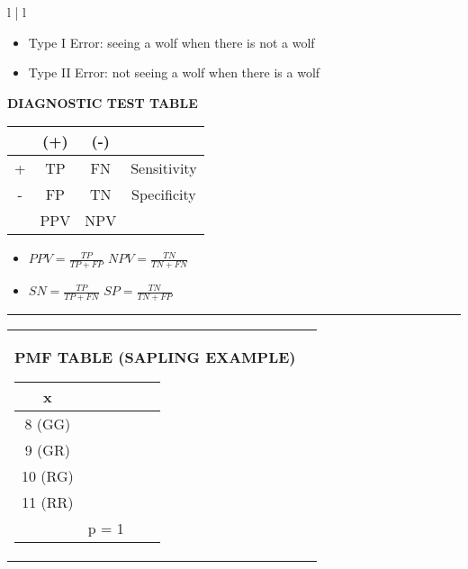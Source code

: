 \documentclass[6pt]{article}
\newcommand{\HL}{\par\noindent\rule{\textwidth}{0.4pt}}
\begin{document}
\begin{footnotesize}
\begin{tabular}{l | l}
{\begin{flushright}
\begin{flushleft}
\begin{itemize}
\item Type I Error: seeing a wolf when there is not a wolf
\item Type II Error: not seeing a wolf when there is a wolf
\end{itemize}


\begin{flushleft}
\textbf{DIAGNOSTIC TEST TABLE}
\end{flushleft}

 \begin{tabular}{||c | c | c | c||} 
 \hline
  & (+) & (-) & \\
 \hline
 + & TP & FN & Sensitivity \\ [0.5ex] 
 \hline
 - & FP & TN & Specificity \\ 
 \hline
 & PPV & NPV & \\
 \hline
\end{tabular}

\begin{itemize}
\item $PPV = \frac{TP}{TP+FP}$ \quad \quad $NPV = \frac{TN}{TN+FN}$
\item $SN = \frac{TP}{TP+FN}$ \quad \quad $SP = \frac{TN}{TN+FP}$
\end{itemize}

\end{flushleft}
\end{flushright}
}

\end{tabular}

\HL

\begin{tabular}{l | l}

\parbox{0.5\textwidth}{

\begin{flushleft}
\textbf{PMF TABLE (SAPLING EXAMPLE)}
\end{flushleft}

 \begin{tabular}{||c | c | c | c||} 
 \hline
 x & $P(X=x)$ & $x \cdot P(X=x)$ & $(x-\mu)^2 \cdot P(X=x)$ \\
 \hline
 8 (GG) & $(1-0.7)(1-0.4)$ & $8(0.18)$ & $(8 - 9.8)^2 \cdot (0.18)$ \\ [0.5ex] 
 \hline
 9 (GR) & $(1-0.7)(0.4)$ & $9(0.12)$ & $(9 - 9.8)^2 \cdot (0.12)$ \\ 
 \hline
 10 (RG) & $(0.7)(1-0.4)$ & $10(0.42)$ & $(10 - 9.8)^2 \cdot (0.42)$ \\
 \hline
 11 (RR) & $(0.7)(0.4)$ & $11(0.28)$ & $(11 - 9.8)^2 \cdot (0.28)$ \\ 
 \hline
  & p = 1 & $\mu = 9.8$ & $\sigma^2 = 1.08$ \\
 \hline
\end{tabular}

}
\end{tabular}
\end{footnotesize}
\end{document}
